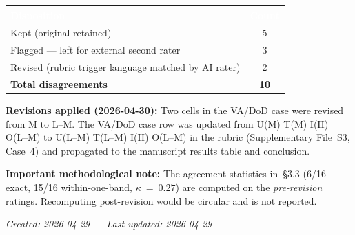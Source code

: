 \medskip

\begin{table}[H]
\footnotesize
\centering
\setlength{\tabcolsep}{8pt}
\renewcommand{\arraystretch}{1.3}
\begin{tabular}{lc}
\toprule
\rowcolor{headerblue}
\textcolor{white}{\textbf{Disposition}} & \textcolor{white}{\textbf{Count}} \\
\midrule
\rowcolor{rowgray}
Kept (original retained) & 5 \\
Flagged --- left for external second rater & 3 \\
\rowcolor{rowgray}
Revised (rubric trigger language matched by AI rater) & 2 \\
\midrule
\textbf{Total disagreements} & \textbf{10} \\
\bottomrule
\end{tabular}
\end{table}

\noindent\textbf{Revisions applied (2026-04-30):} Two cells in the VA/DoD case were revised
from M to L--M. The VA/DoD case row was updated from U(M) T(M) I(H) O(L--M) to
U(L--M) T(L--M) I(H) O(L--M) in the rubric (Supplementary File~S3, Case~4) and
propagated to the manuscript results table and conclusion.

\medskip
\noindent\textbf{Important methodological note:} The agreement statistics in~§3.3
(6/16 exact, 15/16 within-one-band, $\kappa~=~0.27$) are computed on the
\textit{pre-revision} ratings. Recomputing post-revision would be circular and is not reported.

\bigskip

\noindent\textit{Created: 2026-04-29 --- Last updated: 2026-04-29}
